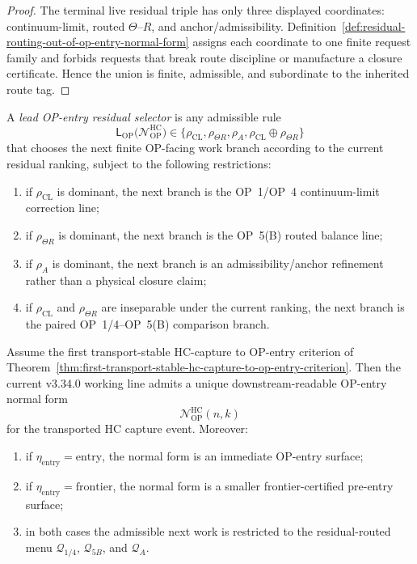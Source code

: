 \begin{proof}
The terminal live residual triple has only three displayed coordinates: continuum-limit, routed $\Theta$--$R$, and anchor/admissibility.  Definition~\ref{def:residual-routing-out-of-op-entry-normal-form} assigns each coordinate to one finite request family and forbids requests that break route discipline or manufacture a closure certificate.  Hence the union is finite, admissible, and subordinate to the inherited route tag.
\end{proof}

\begin{definition}
\label{def:lead-op-entry-residual-selector}
A \emph{lead OP-entry residual selector} is any admissible rule
\[
  \mathsf L_{\mathrm{OP}}
  \bigl(\mathcal N_{\mathrm{OP}}^{\mathrm{HC}}\bigr)
  \in
  \{\rho_{\mathrm{CL}},\rho_{\Theta R},\rho_A,\rho_{\mathrm{CL}}\oplus\rho_{\Theta R}\}
\]
that chooses the next finite OP-facing work branch according to the current residual ranking, subject to the following restrictions:
\begin{enumerate}[leftmargin=2em,label=(\alph*)]
  \item if $\rho_{\mathrm{CL}}$ is dominant, the next branch is the OP~1/OP~4 continuum-limit correction line;
  \item if $\rho_{\Theta R}$ is dominant, the next branch is the OP~5(B) routed balance line;
  \item if $\rho_A$ is dominant, the next branch is an admissibility/anchor refinement rather than a physical closure claim;
  \item if $\rho_{\mathrm{CL}}$ and $\rho_{\Theta R}$ are inseparable under the current ranking, the next branch is the paired OP~1/4--OP~5(B) comparison branch.
\end{enumerate}
\end{definition}

\begin{theorem}
\label{thm:first-op-entry-normal-form-theorem}
Assume the first transport-stable HC-capture to OP-entry criterion of Theorem~\ref{thm:first-transport-stable-hc-capture-to-op-entry-criterion}.  Then the current v3.34.0 working line admits a unique downstream-readable OP-entry normal form
\[
  \mathcal N_{\mathrm{OP}}^{\mathrm{HC}}(n,k)
\]
for the transported HC capture event.  Moreover:
\begin{enumerate}[leftmargin=2em,label=(\roman*)]
  \item if $\eta_{\mathrm{entry}}=\mathrm{entry}$, the normal form is an immediate OP-entry surface;
  \item if $\eta_{\mathrm{entry}}=\mathrm{frontier}$, the normal form is a smaller frontier-certified pre-entry surface;
  \item in both cases the admissible next work is restricted to the residual-routed menu $\mathcal Q_{1/4}$, $\mathcal Q_{5B}$, and $\mathcal Q_A$.
\end{enumerate}
\end{theorem}

